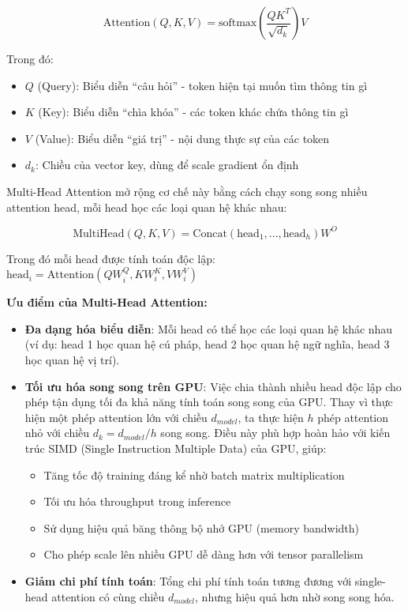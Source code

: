 \begin{equation}
\text{Attention}(Q, K, V) = \text{softmax}\left(\frac{QK^T}{\sqrt{d_k}}\right)V
\end{equation}

Trong đó:
\begin{itemize}
    \item $Q$ (Query): Biểu diễn ``câu hỏi'' - token hiện tại muốn tìm thông tin gì
    \item $K$ (Key): Biểu diễn ``chìa khóa'' - các token khác chứa thông tin gì
    \item $V$ (Value): Biểu diễn ``giá trị'' - nội dung thực sự của các token
    \item $d_k$: Chiều của vector key, dùng để scale gradient ổn định
\end{itemize}

Multi-Head Attention mở rộng cơ chế này bằng cách chạy song song nhiều attention head, mỗi head học các loại quan hệ khác nhau:

\begin{equation}
\text{MultiHead}(Q, K, V) = \text{Concat}(\text{head}_1, ..., \text{head}_h)W^O
\end{equation}

Trong đó mỗi head được tính toán độc lập: $\text{head}_i = \text{Attention}(QW_i^Q, KW_i^K, VW_i^V)$

\textbf{Ưu điểm của Multi-Head Attention:}
\begin{itemize}
    \item \textbf{Đa dạng hóa biểu diễn}: Mỗi head có thể học các loại quan hệ khác nhau (ví dụ: head 1 học quan hệ cú pháp, head 2 học quan hệ ngữ nghĩa, head 3 học quan hệ vị trí).

    \item \textbf{Tối ưu hóa song song trên GPU}: Việc chia thành nhiều head độc lập cho phép tận dụng tối đa khả năng tính toán song song của GPU. Thay vì thực hiện một phép attention lớn với chiều $d_{model}$, ta thực hiện $h$ phép attention nhỏ với chiều $d_k = d_{model}/h$ song song. Điều này phù hợp hoàn hảo với kiến trúc SIMD (Single Instruction Multiple Data) của GPU, giúp:
    \begin{itemize}
        \item Tăng tốc độ training đáng kể nhờ batch matrix multiplication
        \item Tối ưu hóa throughput trong inference
        \item Sử dụng hiệu quả băng thông bộ nhớ GPU (memory bandwidth)
        \item Cho phép scale lên nhiều GPU dễ dàng hơn với tensor parallelism
    \end{itemize}

    \item \textbf{Giảm chi phí tính toán}: Tổng chi phí tính toán tương đương với single-head attention có cùng chiều $d_{model}$, nhưng hiệu quả hơn nhờ song song hóa.
\end{itemize}

